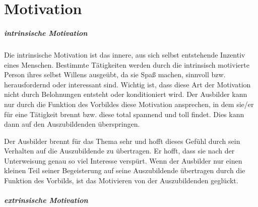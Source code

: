 \chapter{Motivation}

\paragraph{intrinsische Motivation}
Die intrinsische Motivation ist das innere, aus sich selbst entstehende Inzentiv eines Menschen. Bestimmte Tätigkeiten werden durch die intrinsisch motivierte Person ihres selbst Willens ausgeübt, da sie Spaß machen, sinnvoll bzw. herausfordernd oder interessant sind. Wichtig ist, dass diese Art der Motivation nicht durch Belohnungen entsteht oder konditioniert wird. Der Ausbilder kann nur durch die Funktion des Vorbildes diese Motivation ansprechen, in dem sie/er für eine Tätigkeit brennt bzw. diese total spannend und toll findet. Dies kann dann auf den Auszubildenden überspringen. 
\par
Der Ausbilder brennt für das Thema sehr und hofft dieses Gefühl durch sein Verhalten auf die Auszubildende \Azubi zu übertragen. Er hofft, dass sie nach der Unterweisung genau so viel Interesse verspürt. Wenn der Ausbilder nur einen kleinen Teil seiner Begeisterung auf seine Auszubildende übertragen durch die Funktion des Vorbilds, ist das Motivieren von der Auszubildenden geglückt. 

\paragraph{extrinsische Motivation}